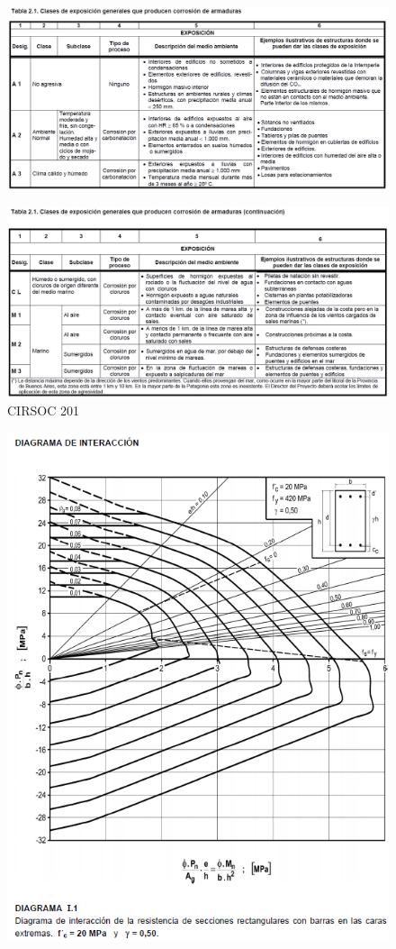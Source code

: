 \documentclass[twocolumn]{article}
\begin{document}
\begin{figure}[htb!]
	\centering
	\hspace{2cm}\includegraphics[width=1\linewidth]{fig/cirsoc201tab21}
	\label{fig:cirsoc201tab21}
\end{figure}
\begin{figure}
	\centering
	\hspace{2cm}\includegraphics[width=1\linewidth]{fig/cirsoc201tab21c}
	\caption{CIRSOC 201}
	\label{fig:cirsoc201tab21c}
\end{figure}

\begin{figure}
	\centering
	\includegraphics[width=1\linewidth]{fig/cirsoc102nomog1}
	\label{fig:cirsoc102nomog1}
\end{figure}
\end{document}
